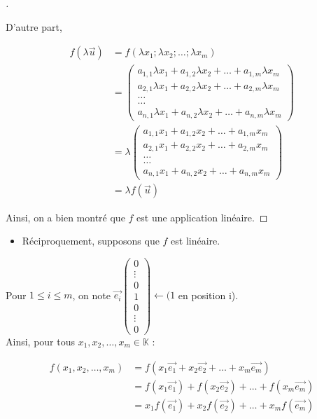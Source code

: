 \documentclass[12pt]{article}
\theoremstyle{break}
\newenvironment{demo}[1][\proofname]{%
  \begin{proof}[#1]$ $\newline
}{%
  \end{proof}
}
\begin{document}
\begin{demo}
D'autre part,

$$
\begin{aligned}
f(\lambda \vec{u}) & =f\left(\lambda x_{1} ; \lambda x_{2} ; \ldots ; \lambda x_{m}\right) \\
& =\left(\begin{array}{c}
a_{1,1} \lambda x_{1}+a_{1,2} \lambda x_{2}+\ldots+a_{1, m} \lambda x_{m} \\
a_{2,1} \lambda x_{1}+a_{2,2} \lambda x_{2}+\ldots+a_{2, m} \lambda x_{m} \\
\ldots \\
\ldots \\
a_{n, 1} \lambda x_{1}+a_{n, 2} \lambda x_{2}+\ldots+a_{n, m} \lambda x_{m}
\end{array}\right) \\
& =\lambda\left(\begin{array}{c}
a_{1,1} x_{1}+a_{1,2} x_{2}+\ldots+a_{1, m} x_{m} \\
a_{2,1} x_{1}+a_{2,2} x_{2}+\ldots+a_{2, m} x_{m} \\
\ldots \\
\ldots \\
a_{n, 1} x_{1}+a_{n, 2} x_{2}+\ldots+a_{n, m} x_{m}
\end{array}\right) \\
& =\lambda f(\vec{u})
\end{aligned}
$$

Ainsi, on a bien montré que $f$ est une application linéaire.
\end{demo}

\begin{itemize}[noitemsep,topsep=0pt]
  \item Réciproquement, supposons que $f$ est linéaire.
\end{itemize}

Pour $1 \leqslant i \leqslant m$, on note $\overrightarrow{e_{i}}\left(\begin{array}{c}0 \\ \vdots \\ 0 \\ 1 \\ 0 \\ \vdots \\ 0\end{array}\right) \leftarrow(1$ en position i).\\
Ainsi, pour tous $x_{1}, x_{2}, \ldots, x_{m} \in \mathbb{K}$ :

$$
\begin{aligned}
f\left(x_{1}, x_{2}, \ldots, x_{m}\right) & =f\left(x_{1} \overrightarrow{e_{1}}+x_{2} \overrightarrow{e_{2}}+\ldots+x_{m} \overrightarrow{e_{m}}\right) \\
& =f\left(x_{1} \overrightarrow{e_{1}}\right)+f\left(x_{2} \overrightarrow{e_{2}}\right)+\ldots+f\left(x_{m} \overrightarrow{e_{m}}\right) \\
& =x_{1} f\left(\overrightarrow{e_{1}}\right)+x_{2} f\left(\overrightarrow{e_{2}}\right)+\ldots+x_{m} f\left(\overrightarrow{e_{m}}\right)
\end{aligned}
$$
\end{document}
